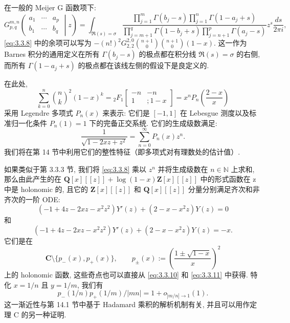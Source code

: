 \begin{remark}\label{rem:3.3.9}
在一般的 Meijer G 函数项下:
\[ G_{p,q}^{m,n}\left(\begin{smallmatrix} a_1 & \cdots & a_p \\ b_1 & \cdots & b_q \end{smallmatrix} \middle| z\right) = \int_{\Re(s) = \sigma} \frac{\prod_{j=1}^m \Gamma(b_j - s) \prod_{j=1}^n \Gamma(1 - a_j + s)}{\prod_{j=m+1}^q \Gamma(1 - b_j + s) \prod_{j=n+1}^p \Gamma(a_j - s)} z^s \frac{ds}{2\pi i}, \]
\eqref{eq:3.3.8} 中的余项可以写为 \(-(n!)^2 G_{2,2}^{2,0} \binom{n+1}{0} \binom{n+1}{0} (1-x)\). 
这一作为 Barnes 积分的通用定义在所有 \(\Gamma(b_j - s)\) 的极点都在积分线 \(\Re(s) = \sigma\) 的右侧, 
而所有 \(\Gamma(1 - a_j + s)\) 的极点都在该线左侧的假设下是良定义的.
\end{remark}

在此处,
\begin{equation}\label{eq:3.3.10}
\sum_{k=0}^{n} {n \choose k}^{2} (1-x)^{k} = {}_{2}F_{1} \begin{bmatrix} -n & -n \\ 1 & ; 1-x \end{bmatrix} = x^{n} P_{n} \left( \frac{2-x}{x} \right)
\end{equation}
采用 Legendre 多项式 \(P_n(x)\) 来表示: 
它们是 \([-1,1]\) 在 Lebesgue 测度以及标准归一化条件 \(P_n(1) = 1\) 下的完备正交系统. 
它们的生成级数满足:
\begin{equation}\label{eq:3.3.11}
\frac{1}{\sqrt{1 - 2xz + z^2}} = \sum_{n=0}^{\infty} P_n(x)z^n.
\end{equation}
我们将在第 14 节中利用它们的整性特征（即多项式对有理数处的估计值）.

如果类似于第 3.3.3 节, 我们将 \eqref{eq:3.3.8} 乘以 \(z^n\) 并将生成级数在 \(n \in \mathbb{N}\) 上求和, 
那么由此产生的在 \(\mathbf{Q}[x]\![\![z]\!] + \log(1-x)\mathbf{Z}[x]\![\![z]\!]\) 中的形式函数在 z 中是 holonomic 的, 
且它的 \(\mathbf{Z}[x][\![z]\!]\) 和 \(\mathbf{Q}[x][\![z]\!]\) 分量分别满足齐次和非齐次的一阶 ODE:
\begin{equation}\label{eq:3.3.12}
(-1 + 4z - 2xz - x^2z^2)Y'(z) + (2 - x - x^2z)Y(z) = 0
\end{equation}
和
\[ (-1 + 4z - 2xz - x^2z^2)Y'(z) + (2 - x - x^2z)Y(z) = -x. \]
它们是在
\[ \mathbf{C} \setminus \{p_{-}(x), p_{+}(x)\}, \qquad p_{\pm}(x) := \left(\frac{1 \pm \sqrt{1 - x}}{x}\right)^{2} \]
上的 holonomic 函数, 这些奇点也可以直接从 \eqref{eq:3.3.10} 和 \eqref{eq:3.3.11} 中获得. 特化 \(x = 1/n\) 且 \(y = 1/m\), 我们有
\[ p_{-}(1/n)p_{+}(1/m)/|mn| = 1 + o_{|m/n| \to 1}(1). \]
这一渐近性与第 14.1 节中基于 Hadamard 乘积的解析机制有关, 并且可以用作定理 C 的另一种证明.

